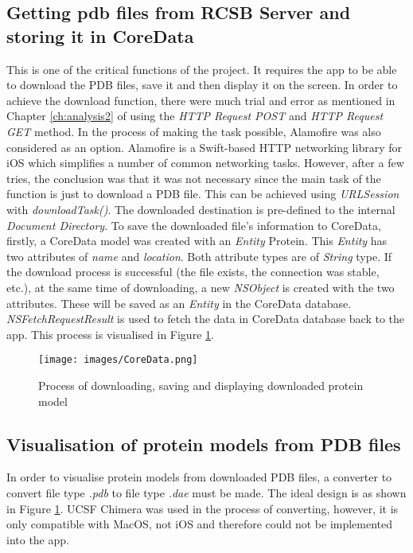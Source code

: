 \subsection{Getting pdb files from RCSB Server and storing it in CoreData}
This is one of the critical functions of the project. It requires the app to be able to download the PDB files, save it and then display it on the screen. 
In order to achieve the download function, there were much trial and error as mentioned in Chapter \ref{ch:analysis2} of using the \emph{HTTP Request POST} and \emph{HTTP Request GET} method. In the process of making the task possible, Alamofire was also considered as an option. Alamofire is a Swift-based HTTP networking library for iOS which simplifies a number of common networking tasks. However, after a few tries, the conclusion was that it was not necessary since the main task of the function is just to download a PDB file. This can be achieved using \emph{URLSession} with \emph{downloadTask()}. The downloaded destination is pre-defined to the internal \emph{Document Directory}. 
To save the downloaded file’s information to CoreData, firstly, a CoreData model was created with an \emph{Entity} Protein. This \emph{Entity} has two attributes of \emph{name} and \emph{location}. Both attribute types are of \emph{String} type. If the download process is successful (the file exists, the connection was stable, etc.), at the same time of downloading, a new \emph{NSObject} is created with the two attributes. These will be saved as an \emph{Entity} in the CoreData database. 
\emph{NSFetchRequestResult} is used to fetch the data in CoreData database back to the app. This process is visualised in Figure \ref{fig:coredata}.

\begin{figure}[!htp]
	\centering
	\texttt{[image: images/CoreData.png]}
	\caption{Process of downloading, saving and displaying downloaded protein model}
	\label{fig:coredata}
\end{figure}


\subsection{Visualisation of protein models from PDB files}
In order to visualise protein models from downloaded PDB files, a converter to convert file type \emph{.pdb} to file type \emph{.dae} must be made. The ideal design is as shown in Figure \ref{fig:coredata}. UCSF Chimera was used in the process of converting, however, it is only compatible with MacOS, not iOS and therefore could not be implemented into the app.


